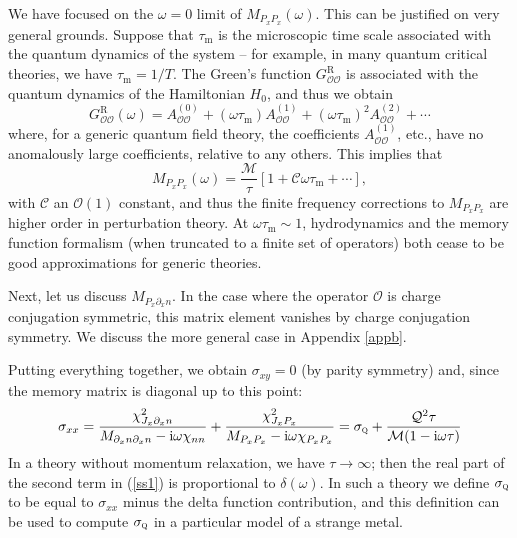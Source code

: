 \documentclass[10pt, oneside]{book}
\begin{document}
\begin{doublespace}
We have focused on the $\omega=0$ limit of $M_{P_xP_x}(\omega)$.   This can be justified on very general grounds.    Suppose that $\tau_{\mathrm{m}}$ is the microscopic time scale associated with the quantum dynamics of the system -- for example, in many quantum critical theories, we have $\tau_{\mathrm{m}} = 1/T$.    The Green's function $G^{\mathrm{R}}_{\mathcal{OO}}$ is associated with the quantum dynamics of the Hamiltonian $H_0$, and thus we obtain \begin{equation}
G^{\mathrm{R}}_{\mathcal{OO}}(\omega)= A^{(0)}_{\mathcal{OO}}+ (\omega \tau_{\mathrm{m}}) A^{(1)}_{\mathcal{OO}} +  (\omega \tau_{\mathrm{m}})^2 A^{(2)}_{\mathcal{OO}} + \cdots
\end{equation}
where, for a generic quantum field theory, the coefficients $A^{(1)}_{\mathcal{OO}}$, etc., have no anomalously large coefficients, relative to any others.    This implies that \begin{equation}
M_{P_xP_x}(\omega) = \frac{\mathcal{M}}{\tau}\left[1+\mathcal{C}\omega\tau_{\mathrm{m}} + \cdots\right],
\end{equation}with $\mathcal{C}$ an $\mathcal{O}(1)$ constant, and thus the finite frequency corrections to $M_{P_xP_x}$ are higher order in perturbation theory.   At  $\omega \tau_{\mathrm{m}} \sim 1$, hydrodynamics and the memory function formalism (when truncated to a finite set of operators) both cease to be good approximations for generic theories.

Next, let us discuss $M_{P_x\partial_x n}$.    In the case where the operator $\mathcal{O}$ is charge conjugation symmetric, this matrix element vanishes by charge conjugation symmetry.   We discuss the more general case in Appendix \ref{appb}.  

Putting everything together, we obtain $\sigma_{xy}=0$ (by parity symmetry) and, since the memory matrix is diagonal up to this point: \begin{equation}
\sigma_{xx} = \frac{\chi_{J_x\partial_x n}^2}{M_{\partial_x n \partial_x n} - \mathrm{i}\omega \chi_{nn}} + \frac{\chi_{J_xP_x}^2}{M_{P_xP_x} - \mathrm{i}\omega \chi_{P_xP_x}} = \sigma_{\textsc{q}} + \frac{\mathcal{Q}^2\tau}{\mathcal{M}(1-\mathrm{i}\omega \tau)}
\label{ss1}
\end{equation}
In a theory without momentum relaxation, we have $\tau \rightarrow \infty$; then the real part of the second term in (\ref{ss1}) is proportional to $\delta (\omega)$. In such a theory we define $\sigma_{\textsc{q}}$ to be equal to 
$\sigma_{xx}$ minus the delta function contribution, and this definition can be used
to compute $\sigma_{\textsc{q}}$ in a particular model of a strange metal.


\end{doublespace}
\end{document}
